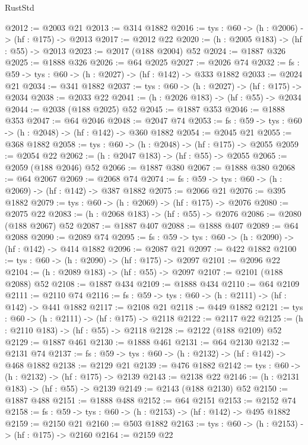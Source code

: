 \begin{lexlean}{RustStd}
\begin{coremodule}
@2012 := @2003 @21
@2013 := @314 @1882
@2016 := {tys : @60} -> (h : @2006) -> (hf : @175) -> @2013
@2017 := @2012 @22
@2020 := (h : @2005 @183) -> (hf : @55) -> @2013
@2023 := @2017 (@188 @2004) @52
@2024 := @1887 @326
@2025 := @1888 @326
@2026 := @64 @2025
@2027 := @2026 @74
@2032 := {fs : @59} -> {tys : @60} -> (h : @2027) -> (hf : @142) -> @333 @1882
@2033 := @2024 @21
@2034 := @341 @1882
@2037 := {tys : @60} -> (h : @2027) -> (hf : @175) -> @2034
@2038 := @2033 @22
@2041 := (h : @2026 @183) -> (hf : @55) -> @2034
@2044 := @2038 (@188 @2025) @52
@2045 := @1887 @353
@2046 := @1888 @353
@2047 := @64 @2046
@2048 := @2047 @74
@2053 := {fs : @59} -> {tys : @60} -> (h : @2048) -> (hf : @142) -> @360 @1882
@2054 := @2045 @21
@2055 := @368 @1882
@2058 := {tys : @60} -> (h : @2048) -> (hf : @175) -> @2055
@2059 := @2054 @22
@2062 := (h : @2047 @183) -> (hf : @55) -> @2055
@2065 := @2059 (@188 @2046) @52
@2066 := @1887 @380
@2067 := @1888 @380
@2068 := @64 @2067
@2069 := @2068 @74
@2074 := {fs : @59} -> {tys : @60} -> (h : @2069) -> (hf : @142) -> @387 @1882
@2075 := @2066 @21
@2076 := @395 @1882
@2079 := {tys : @60} -> (h : @2069) -> (hf : @175) -> @2076
@2080 := @2075 @22
@2083 := (h : @2068 @183) -> (hf : @55) -> @2076
@2086 := @2080 (@188 @2067) @52
@2087 := @1887 @407
@2088 := @1888 @407
@2089 := @64 @2088
@2090 := @2089 @74
@2095 := {fs : @59} -> {tys : @60} -> (h : @2090) -> (hf : @142) -> @414 @1882
@2096 := @2087 @21
@2097 := @422 @1882
@2100 := {tys : @60} -> (h : @2090) -> (hf : @175) -> @2097
@2101 := @2096 @22
@2104 := (h : @2089 @183) -> (hf : @55) -> @2097
@2107 := @2101 (@188 @2088) @52
@2108 := @1887 @434
@2109 := @1888 @434
@2110 := @64 @2109
@2111 := @2110 @74
@2116 := {fs : @59} -> {tys : @60} -> (h : @2111) -> (hf : @142) -> @441 @1882
@2117 := @2108 @21
@2118 := @449 @1882
@2121 := {tys : @60} -> (h : @2111) -> (hf : @175) -> @2118
@2122 := @2117 @22
@2125 := (h : @2110 @183) -> (hf : @55) -> @2118
@2128 := @2122 (@188 @2109) @52
@2129 := @1887 @461
@2130 := @1888 @461
@2131 := @64 @2130
@2132 := @2131 @74
@2137 := {fs : @59} -> {tys : @60} -> (h : @2132) -> (hf : @142) -> @468 @1882
@2138 := @2129 @21
@2139 := @476 @1882
@2142 := {tys : @60} -> (h : @2132) -> (hf : @175) -> @2139
@2143 := @2138 @22
@2146 := (h : @2131 @183) -> (hf : @55) -> @2139
@2149 := @2143 (@188 @2130) @52
@2150 := @1887 @488
@2151 := @1888 @488
@2152 := @64 @2151
@2153 := @2152 @74
@2158 := {fs : @59} -> {tys : @60} -> (h : @2153) -> (hf : @142) -> @495 @1882
@2159 := @2150 @21
@2160 := @503 @1882
@2163 := {tys : @60} -> (h : @2153) -> (hf : @175) -> @2160
@2164 := @2159 @22

\end{coremodule}
\end{lexlean}
